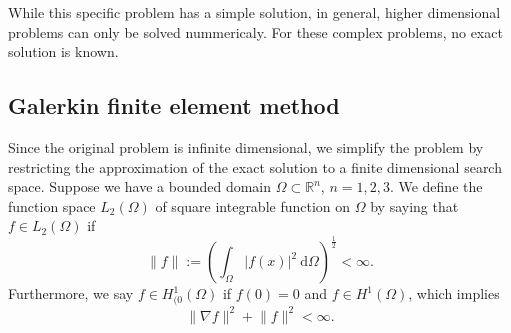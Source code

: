\documentclass[a4paper]{article}
\newcommand{\dd}{\mathrm{d}}
\newcommand{\Reals}{\mathbb{R}}
\newcommand{\LO}{\ensuremath{L_2(\Omega)}}
\newcommand{\HO}{\ensuremath{H^1(\Omega)}}
\newcommand{\HOzero}{\ensuremath{H^1_{(0}(\Omega)}}
\begin{document}
While this specific problem has a simple solution, in general, higher
dimensional problems can only be solved nummericaly. For these complex
problems, no exact solution is known.

\subsection{Galerkin finite element method} \label{seq:Galerkin}

Since the original problem is infinite dimensional, we simplify the
problem by restricting the approximation of the exact solution to a
finite dimensional search space. Suppose we have a bounded domain
$\Omega \subset \Reals^n$, $n = 1, 2, 3$.  We define the function
space $\LO$ of square integrable function on $\Omega$ by saying that
$f \in \LO$ if
\begin{equation}
  \lVert f \rVert := \left(
    \int_\Omega | f(x) |^2 \ \dd\Omega \right)^{\frac{1}{2}} < \infty.
\end{equation}
Furthermore, we say $f \in \HOzero$ if $f(0) = 0$ and $f \in \HO$,
which implies
\begin{equation}
  \lVert \nabla f \rVert^2 + \lVert f \rVert^2 < \infty.
\end{equation}
\end{document}
